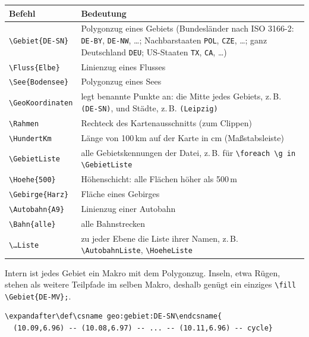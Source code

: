 \begin{center}
\small
\begin{tabular}{@{}l>{\raggedright\arraybackslash}p{11cm}@{}}
	\toprule
	\textbf{Befehl} & \textbf{Bedeutung} \\
	\midrule
	\texttt{\textbackslash Gebiet\{DE-SN\}} & Polygonzug eines Gebiets (Bundesländer nach ISO 3166-2: \texttt{DE-BY}, \texttt{DE-NW}, \dots; Nachbarstaaten \texttt{POL}, \texttt{CZE}, \dots; ganz Deutschland \texttt{DEU}; US-Staaten \texttt{TX}, \texttt{CA}, \dots) \\
	\texttt{\textbackslash Fluss\{Elbe\}} & Linienzug eines Flusses \\
	\texttt{\textbackslash See\{Bodensee\}} & Polygonzug eines Sees \\
	\texttt{\textbackslash GeoKoordinaten} & legt benannte Punkte an: die Mitte jedes Gebiets, z.\,B. \texttt{(DE-SN)}, und Städte, z.\,B. \texttt{(Leipzig)} \\
	\texttt{\textbackslash Rahmen} & Rechteck des Kartenausschnitts (zum Clippen) \\
	\texttt{\textbackslash HundertKm} & Länge von 100\,km auf der Karte in cm (Maßstabsleiste) \\
	\texttt{\textbackslash GebietListe} & alle Gebietskennungen der Datei, z.\,B. für \texttt{\textbackslash foreach \textbackslash g in \textbackslash GebietListe} \\
	\midrule
	\texttt{\textbackslash Hoehe\{500\}} & Höhenschicht: alle Flächen höher als 500\,m \\
	\texttt{\textbackslash Gebirge\{Harz\}} & Fläche eines Gebirges \\
	\texttt{\textbackslash Autobahn\{A9\}} & Linienzug einer Autobahn \\
	\texttt{\textbackslash Bahn\{alle\}} & alle Bahnstrecken \\
	\texttt{\textbackslash \dots Liste} & zu jeder Ebene die Liste ihrer Namen, z.\,B. \texttt{\textbackslash AutobahnListe}, \texttt{\textbackslash HoeheListe} \\
	\bottomrule
\end{tabular}
\end{center}

Intern ist jedes Gebiet ein Makro mit dem Polygonzug. Inseln, etwa Rügen, stehen als weitere Teilpfade im selben Makro, deshalb genügt ein einziges \texttt{\textbackslash fill \textbackslash Gebiet\{DE-MV\};}.

\begin{lstlisting}[style=latex]
\expandafter\def\csname geo:gebiet:DE-SN\endcsname{
  (10.09,6.96) -- (10.08,6.97) -- ... -- (10.11,6.96) -- cycle}
\end{lstlisting}


